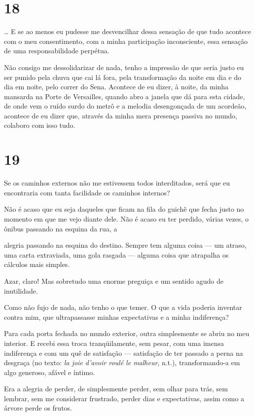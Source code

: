 \section{18}

\ldots{} E se ao menos eu pudesse me desvencilhar dessa sensação de que
tudo acontece com o meu consentimento, com a minha participação
inconsciente, essa sensação de uma responsabilidade perpétua.

Não consigo me dessolidarizar de nada, tenho a impressão de que seria
justo eu ser punido pela chuva que cai lá fora, pela transformação da
noite em dia e do dia em noite, pelo correr do Sena. Acontece de eu
dizer, à noite, da minha mansarda na Porte de Versailles, quando abro a
janela que dá para esta cidade, de onde vem o ruído surdo do metrô e a
melodia desengonçada de um acordeão, acontece de eu dizer que, através
da minha mera presença passiva no mundo, colaboro com isso tudo.

\section{19}

Se os caminhos externos não me estivessem todos interditados, será que
eu encontraria com tanta facilidade os caminhos internos?

Não é acaso que eu seja daqueles que ficam na fila do guichê que fecha
justo no momento em que me vejo diante dele. Não é acaso eu ter perdido,
várias vezes, o ônibus passando na esquina da rua, a

alegria passando na esquina do destino. Sempre tem alguma coisa --- um
atraso, uma carta extraviada, uma gola rasgada --- alguma coisa que
atrapalha os cálculos mais simples.

Azar, claro! Mas sobretudo uma enorme preguiça e um sentido agudo de
inutilidade.

Como não fujo de nada, não tenho o que temer. O que a vida poderia
inventar contra mim, que ultrapassasse minhas expectativas e a minha
indiferença?

Para cada porta fechada no mundo exterior, outra simplesmente se abriu
no meu interior. E recebi essa troca tranqüilamente, sem pesar, com uma
imensa indiferença e com um quê de satisfação --- satisfação de ter
passado a perna na desgraça (no texto: \emph{la joie d'avoir roulé le
malheur}, n.t.), transformando-a em algo generoso, afável e íntimo.

Era a alegria de perder, de simplesmente perder, sem olhar para trás,
sem lembrar, sem me considerar frustrado, perder dias e expectativas,
assim como a árvore perde os frutos.

